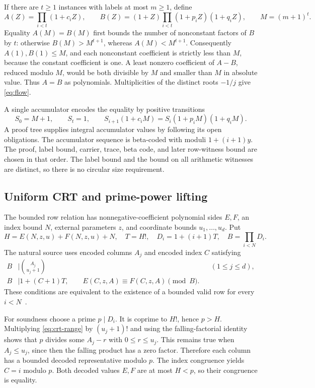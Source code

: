 \documentclass[11pt,letterpaper]{article}
\theoremstyle{definition}
\begin{document}
If there are $t\ge1$ instances with labels at most $m\ge1$, define
\[
A(Z)=\prod_{i<t}(1+c_iZ),\qquad
B(Z)=(1+Z)\prod_{i<t}(1+p_iZ)(1+q_iZ),\qquad M=(m+1)^t.
\]
Equality $A(M)=B(M)$ first bounds the number of nonconstant factors of
$B$ by $t$: otherwise $B(M)>M^{t+1}$, whereas
$A(M)<M^{t+1}$. Consequently $A(1),B(1)\le M$, and each nonconstant
coefficient is strictly less than $M$, because the constant coefficient
is one. A least nonzero coefficient of $A-B$, reduced modulo $M$, would
be both divisible by $M$ and smaller than $M$ in absolute value. Thus
$A=B$ as polynomials. Multiplicities of the distinct roots $-1/j$ give
\eqref{eq:flow}.

A single accumulator encodes the equality by positive transitions
\[
S_0=M+1,\qquad S_t=1,\qquad
S_{i+1}(1+c_iM)=S_i(1+p_iM)(1+q_iM).
\]
A proof tree supplies integral accumulator values by following its open
obligations. The accumulator sequence is beta-coded with moduli
$1+(i+1)y$. The proof, label bound, carrier, trace, beta code, and later
row-witness bound are chosen in that order. The label bound and the
bound on all arithmetic witnesses are distinct, so there is no circular
size requirement.

\subsection{Uniform CRT and prime-power lifting}

The bounded row relation has nonnegative-coefficient polynomial sides
$E,F$, an index bound $N$, external parameters $z$, and coordinate
bounds $u_1,\ldots,u_d$. Put
\[
H=E(N,z,u)+F(N,z,u)+N,\quad T=H!,\quad
D_i=1+(i+1)T,\quad B=\prod_{i<N}D_i.
\]
The natural source uses encoded columns $A_j$ and encoded index $C$
satisfying
\begin{align}
B&\mid\binom{A_j}{u_j+1} &&(1\le j\le d),\label{eq:crt-range}\\
B&\mid1+(C+1)T,\qquad
E(C,z,A)\equiv F(C,z,A)\pmod B.\label{eq:crt-row}
\end{align}
These conditions are equivalent to the existence of a bounded valid row
for every $i<N$~\cite{repo-prime}.

For soundness choose a prime $p\mid D_i$. It is coprime to $H!$, hence
$p>H$. Multiplying \eqref{eq:crt-range} by $(u_j+1)!$ and using the
falling-factorial identity shows that $p$ divides some $A_j-r$ with
$0\le r\le u_j$. This remains true when $A_j\le u_j$, since then the
falling product has a zero factor. Therefore each column has a bounded
decoded representative modulo $p$. The index congruence yields $C=i$
modulo $p$. Both decoded values $E,F$ are at most $H<p$, so their
congruence is equality.
\end{document}
